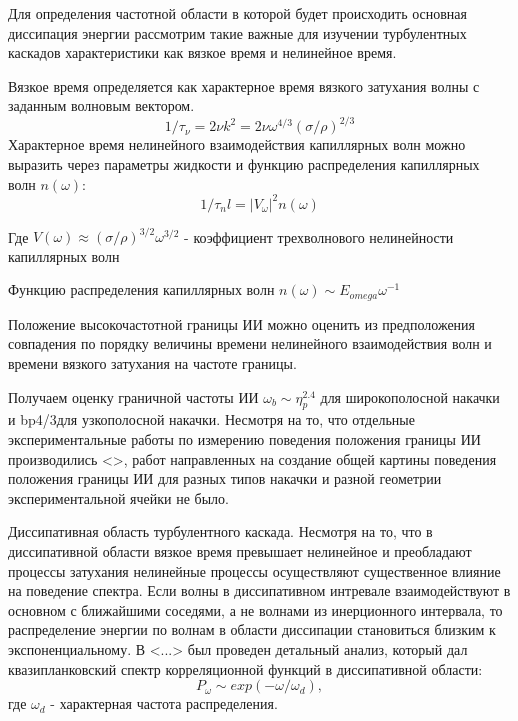 Для определения частотной области в которой будет происходить основная диссипация энергии рассмотрим такие важные для изучении турбулентных каскадов характеристики как вязкое время и нелинейное время.

Вязкое время определяется как характерное время вязкого затухания волны с заданным волновым вектором.
\begin{equation}
1/\tau_\nu = 2\nu k^2 = 2 \nu \omega^{4/3}(\sigma/\rho)^{2/3}
\end{equation}
Характерное время нелинейного взаимодействия капиллярных волн можно выразить через параметры жидкости и функцию распределения капиллярных волн $n(\omega)$:
\begin{equation}
1/\tau_nl = |V_\omega|^2 n(\omega)
\end{equation}

Где $V(\omega) \approx (\sigma/\rho)^{3/2}\omega^{3/2}$ - коэффициент трехволнового нелинейности капиллярных волн

Функцию распределения капиллярных волн $n(\omega) \sim E_{omega}\omega^{-1}$ 

Положение высокочастотной границы ИИ можно оценить из предположения совпадения по порядку величины времени нелинейного взаимодействия волн и времени вязкого затухания на частоте границы.

Получаем оценку граничной частоты ИИ $\omega_b \sim \eta_p^{2.4}$ для широкополосной накачки и bp4/3для узкополосной накачки. Несмотря на то, что отдельные экспериментальные работы по измерению поведения положения границы ИИ производились <>, работ направленных на создание общей картины поведения положения границы ИИ для разных типов накачки и разной геометрии экспериментальной ячейки не было.

Диссипативная область турбулентного каскада.
Несмотря на то, что в диссипативной области вязкое время превышает нелинейное и преобладают процессы затухания нелинейные процессы осуществляют существенное влияние на поведение спектра. Если волны в диссипативном интревале взаимодействуют в основном с ближайшими соседями, а не волнами из инерционного интервала, то распределение энергии по волнам в области диссипации становиться близким к экспоненциальному. В <...> был проведен детальный анализ, который дал квазипланковский спектр корреляционной функций в диссипативной области:
\begin{equation}
P_\omega \sim exp(-\omega/\omega_d),
\end{equation}
где $\omega_d$ - характерная частота распределения.
